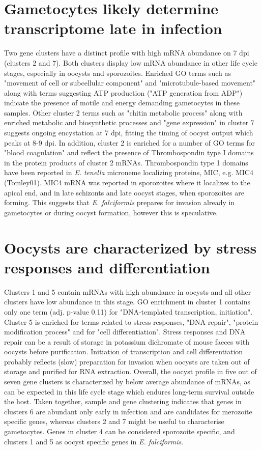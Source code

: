 \documentclass{bmcart}
\begin{document}
\section*{Gametocytes likely determine transcriptome late in infection}
Two gene clusters have a distinct profile with high mRNA abundance on 7 dpi (clusters 2 and 7). Both clusters display low mRNA abundance in other life cycle stages, especially in oocysts and sporozoites. Enriched GO terms such as "movement of cell or subcellular component" and "microtubule-based movement" along with terms suggesting ATP production ("ATP generation from ADP") indicate the presence of motile and energy demanding gametocytes in these samples. Other cluster 2 terms such as "chitin metabolic process" along with enriched metabolic and biosynthetic processes and "gene expression" in cluster 7 suggests ongoing encystation at 7 dpi, fitting the timing of oocyst output which peaks at 8-9 dpi. In addition, cluster 2 is enriched for a number of GO terms for "blood coagulation" and reflect 
the presence of Thrombospondin type I domains in the protein products of cluster 2 mRNAs. Thrombospondin type 1 domains have been reported in \textit{E. tenella} microneme localizing proteins, MIC, e.g. MIC4 (Tomley01). MIC4 mRNA was reported in sporozoites where it localizes to the apical end, and in late schizonts and late oocyst stages, when sporozoites are forming. This suggests that \textit{E. falciformis} prepares for invasion already in gametocytes or during oocyst formation, however this is speculative.

\section*{Oocysts are characterized by stress responses and differentiation}
Clusters 1 and 5 contain mRNAs with high abundance in oocysts and all other clusters have low abundance in this stage. GO enrichment in cluster 1 contains only one term (adj. p-value 0.11) for "DNA-templated transcription, initiation". Cluster 5 is enriched for terms related to stress responses, "DNA repair", "protein modification process" and for "cell differentiation". Stress responses and DNA repair can be a result of storage in potassium dichromate of mouse faeces with oocysts before purification. Initiation of transcription and cell differentiation probably reflects (slow) preparation for invasion when oocysts are taken out of storage and purified for RNA extraction. Overall, the oocyst profile in five out of seven gene clusters is characterized by below average abundance of mRNAs, as can be expected in this life cycle stage which endures long-term survival outside the host. Taken together, sample and gene clustering indicates that genes in clusters 6 are abundant only early in infection and are candidates for merozoite specific genes, whereas clusters 2 and 7 might be useful to characterise gametocytes. Genes in cluster 4 can be considered sporozoite specific, and clusters 1 and 5 as oocyst specific genes in \textit{E. falciformis}.
\end{document}
